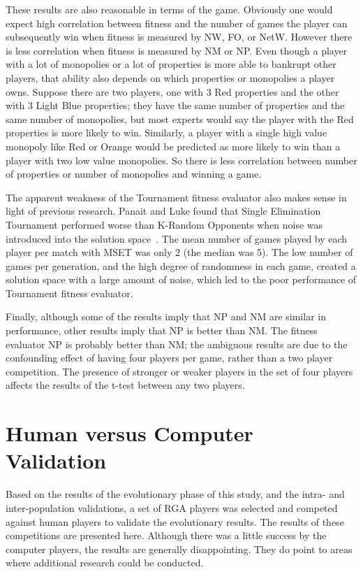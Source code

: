 These results are also reasonable in terms of the game. Obviously one would
expect high correlation between fitness and the number of games the player can
subsequently win when fitness is measured by NW, FO, or NetW. However there is
less correlation when fitness is measured by NM or NP. Even though a player with
a lot of monopolies or a lot of properties is more able to bankrupt other
players, that ability also depends on which properties or monopolies a player
owns. Suppose there are two players, one with 3 Red properties and the other
with 3 Light Blue properties; they have the same number of properties and the
same number of monopolies, but most experts would say the player with the Red
properties is more likely to win. Similarly, a player with a single high value
monopoly like Red or Orange would be predicted as more likely to win than a
player with two low value monopolies. So there is less correlation between
number of properties or number of monopolies and winning a game.

The apparent weakness of the Tournament fitness evaluator also makes sense in
light of previous research. Panait and Luke found that Single Elimination
Tournament performed worse than K-Random Opponents when noise was introduced
into the solution space~\cite{Panait02acomparative}. The mean number of games
played by each player per match with MSET was only 2 (the median was 5). The low
number of games per generation, and the high degree of randomness in each game,
created a solution space with a large amount of noise, which led to the poor
performance of Tournament fitness evaluator.

Finally, although some of the results imply that NP and NM are similar in
performance, other results imply that NP is better than NM. The fitness
evaluator NP is probably better than NM; the ambiguous results are due to the
confounding effect of having four players per game, rather than a two player
competition. The presence of stronger or weaker players in the set of four
players affects the results of the t-test between any two players.

\section{Human versus Computer Validation}\label{6_humanValidation}

Based on the results of the evolutionary phase of this study, and the intra- and
inter-population validations, a set of RGA players was selected and competed
against human players to validate the evolutionary results. The results of these
competitions are presented here. Although there was a little success by the
computer players, the results are generally disappointing. They do point to
areas where additional research could be conducted.

